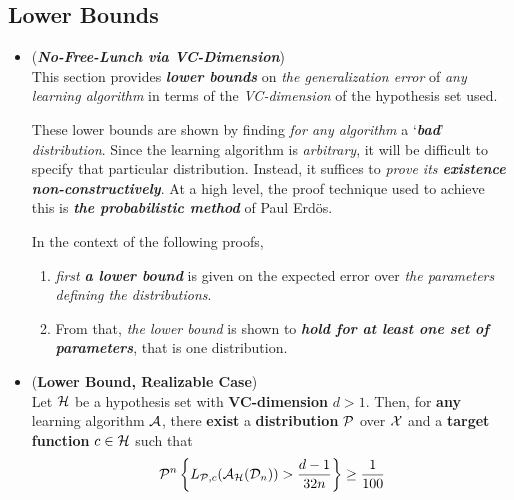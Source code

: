 \documentclass[11pt]{article}
\begin{document}
\subsection{Lower Bounds}
\begin{itemize}
\item \begin{remark} (\emph{\textbf{No-Free-Lunch via VC-Dimension}})\\
This section provides \emph{\textbf{lower bounds}} on \emph{the generalization error} of \emph{any learning algorithm} in terms of the \emph{VC-dimension} of the hypothesis set used.

These lower bounds are shown by finding \emph{for any algorithm} a `\emph{\textbf{bad}}' \emph{distribution}. Since the learning algorithm is \emph{arbitrary}, it will be difficult to specify that particular distribution. Instead, it suffices to \emph{prove its \textbf{existence} \textbf{non-constructively}}. At a high level, the proof technique used to achieve this is \emph{\textbf{the probabilistic method}} of Paul Erd\"os. 

In the context of the following proofs, 
\begin{enumerate}
\item \emph{first} \emph{\textbf{a lower bound}} is given on the expected error over \emph{the parameters defining the distributions}.

\item  From that, \emph{the lower bound} is shown to \emph{\textbf{hold for at least one set of parameters}}, that is one distribution.
\end{enumerate}
\end{remark}

\item \begin{proposition} (\textbf{Lower Bound, Realizable Case}) \citep{mohri2018foundations}\\
Let ${\mathcal H}$ be a hypothesis set with \textbf{VC-dimension} $d > 1$. Then, for \textbf{any} learning algorithm ${\mathcal A}$, there \textbf{exist} a \textbf{distribution} ${\mathcal P}$ over ${\mathcal X}$ and a \textbf{target function} $c \in {\mathcal H}$ such that
\begin{align*}
{\mathcal P}^n\left\{L_{{\mathcal P}, c}({\mathcal A}_{{\mathcal H}}({\mathcal D}_n)) > \frac{d-1}{32 n}\right\} \ge \frac{1}{100}
\end{align*}
\end{proposition}


\end{itemize}
\end{document}
